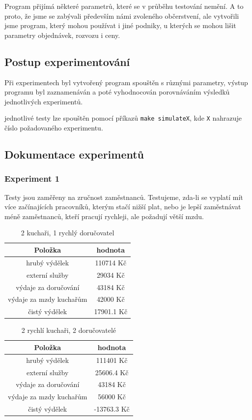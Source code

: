 \documentclass[a4paper, 11pt]{article}
\begin{document}
Program přijímá některé parametrů, které se v průběhu testování nemění. A to proto, že jsme se zabývali především námi zvoleného občerstvení, ale vytvořili jsme program, který mohou používat i jiné podniky, u kterých se mohou lišit parametry objednávek, rozvozu i ceny.

\subsection{Postup experimentování}
Při experimentech byl vytvořený program spouštěn s různými parametry, výstup programu byl zaznamenáván a poté vyhodnocován porovnáváním výsledků jednotlivých experimentů.


jednotlivé testy lze spouštěn pomocí příkazů \texttt{make simulateX}, kde \texttt{X} nahrazuje číslo požadovaného experimentu.

\subsection{Dokumentace experimentů}


\subsubsection{Experiment 1}
Testy jsou zaměřeny na zručnost zaměstnanců. Testujeme, zda-li se vyplatí mít více začínajících pracovníků, kterým stačí nižší plat, nebo je lepší zaměstnávat méně zaměstnanců, kteří pracují rychleji, ale požadují větší mzdu.


\begin{table}[h]
\centering
\begin{tabular}{cc}
\textbf{Položka} & \textbf{hodnota}                                                                                   \\ \hline
hrubý výdělek & 110714 Kč \\ \hline
externí služby  & 29034 Kč \\ \hline
výdaje za doručování &  43184 Kč \\ \hline
výdaje za mzdy kuchařům &  42000 Kč \\ \hline
čistý výdělek &  17901.1 Kč
\end{tabular}
\caption{2 kuchaři, 1 rychlý doručovatel}
\end{table}

\begin{table}[h]
\centering
\begin{tabular}{cc}
\textbf{Položka} & \textbf{hodnota}                                                                                   \\ \hline
hrubý výdělek & 111401 Kč \\ \hline
externí služby  & 25606.4 Kč \\ \hline
výdaje za doručování &  43184 Kč \\ \hline
výdaje za mzdy kuchařům &  56000 Kč \\ \hline
čistý výdělek & -13763.3 Kč
\end{tabular}
\caption{2 rychlí kuchaři, 2 doručovatelé}
\end{table}
\end{document}
